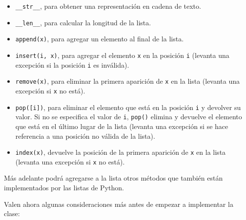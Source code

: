 \begin{itemize}
\item \lstinline|__str__|, para obtener una representación en cadena de texto.

\item \lstinline|__len__|, para calcular la longitud de la lista.

\item \lstinline|append(x)|, para agregar un elemento al final de la lista.

\item \lstinline|insert(i, x)|, para agregar el elemento \lstinline!x! en la
posición \lstinline!i! (levanta una excepción si la posición \lstinline!i! es
inválida).

\item \lstinline|remove(x)|, para eliminar la primera aparición de
\lstinline!x! en la lista (levanta una excepción si \lstinline!x! no está).

\item \lstinline|pop([i])|, para eliminar el elemento que está en la posición
\lstinline!i! y devolver su valor. Si no se especifica el valor de
\lstinline!i!, \lstinline|pop()| elimina y devuelve el elemento que está en
el último lugar de la lista (levanta una excepción si se hace referencia a
una posición no válida de la lista).

\item \lstinline|index(x)|, devuelve la posición de la primera aparición de
\lstinline!x! en la lista (levanta una excepción si \lstinline!x! no está).
\end{itemize}

Más adelante podrá agregarse a la lista otros métodos que también están
implementados por las listas de Python.

Valen ahora algunas consideraciones más antes de empezar a implementar la clase:

